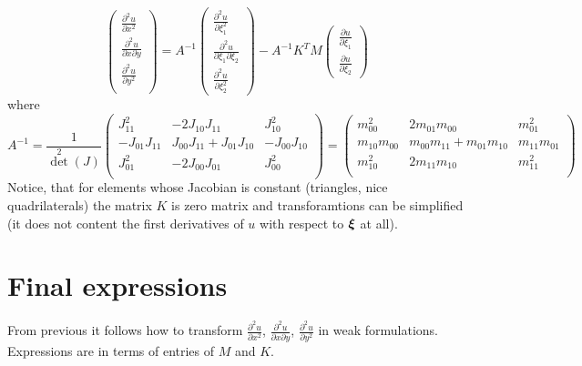 \documentclass[a4paper,12pt]{article}
\newcommand{\bfxi}{\mbox{\boldmath $\xi$}}
\begin{document}
$$
\left(\begin{array}{c}
\frac{\partial^2 u}{\partial x^2} \\[3mm]
\frac{\partial^2 u}{\partial x \partial y} \\[3mm]
\frac{\partial^2 u}{\partial y^2} \\[3mm]
\end{array}\right) = A^{-1} 
\left(\begin{array}{c}
\frac{\partial^2 u}{\partial \xi_1^2} \\[3mm]
\frac{\partial^2 u}{\partial \xi_1 \partial \xi_2} \\[3mm]
\frac{\partial^2 u}{\partial \xi_2^2} 
\end{array}\right) -
A^{-1} K^T M
\left(\begin{array}{c}
\frac{\partial u}{\partial \xi_1} \\[3mm]
\frac{\partial u}{\partial \xi_2}
\end{array}\right)
$$
where
$$
A^{-1} = \frac{1}{\det^2(J)}
\left(\begin{array}{ccc}
J_{11}^2 & -2J_{10}J_{11} & J_{10}^2 \\[3mm] 
-J_{01}J_{11} & J_{00}J_{11} + J_{01}J_{10} & -J_{00}J_{10} \\[3mm] 
J_{01}^2 & -2J_{00}J_{01} & J_{00}^2 \\[3mm] 
\end{array}\right) =
\left(\begin{array}{ccc}
m_{00}^2 & 2m_{01}m_{00} & m_{01}^2 \\[3mm] 
m_{10}m_{00} & m_{00}m_{11} + m_{01}m_{10} & m_{11}m_{01} \\[3mm] 
m_{10}^2 & 2m_{11}m_{10} & m_{11}^2 \\[3mm] 
\end{array}\right) 
$$
Notice, that for elements whose Jacobian is constant (triangles, nice quadrilaterals) the matrix $K$ is zero matrix and transforamtions can be simplified (it does not content the first derivatives of $u$ with respect to $\bfxi$ at all).

\section{Final expressions}
From previous it follows how to transform $\frac{\partial^2 u}{\partial x^2}$, $\frac{\partial^2 u}{\partial x \partial y}$, $\frac{\partial^2 u}{\partial y^2}$ in weak formulations. Expressions are in terms of entries of $M$ and $K$.
\end{document}

